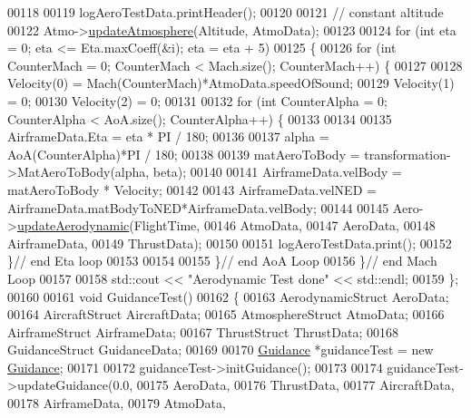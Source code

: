 \begin{DoxyCode}
00118 
00119     logAeroTestData.printHeader();
00120 
00121     \textcolor{comment}{// constant altitude}
00122     Atmo->\hyperlink{group___atmosphere_a2bd97471d32725d6196ee6816ea36c99}{updateAtmosphere}(Altitude, AtmoData);
00123 
00124     \textcolor{keywordflow}{for} (\textcolor{keywordtype}{int} eta = 0; eta <= Eta.maxCoeff(&i); eta = eta + 5)
00125     \{
00126         \textcolor{keywordflow}{for} (\textcolor{keywordtype}{int} CounterMach = 0; CounterMach < Mach.size(); CounterMach++) \{
00127 
00128             Velocity(0) = Mach(CounterMach)*AtmoData.speedOfSound;
00129             Velocity(1) = 0;
00130             Velocity(2) = 0;
00131 
00132             \textcolor{keywordflow}{for} (\textcolor{keywordtype}{int} CounterAlpha = 0; CounterAlpha < AoA.size(); CounterAlpha++) \{
00133 
00134 
00135                 AirframeData.Eta = eta * PI / 180;
00136 
00137                 alpha = AoA(CounterAlpha)*PI / 180;
00138 
00139                 matAeroToBody = transformation->MatAeroToBody(alpha, beta);
00140 
00141                 AirframeData.velBody = matAeroToBody * Velocity;
00142 
00143                 AirframeData.velNED = AirframeData.matBodyToNED*AirframeData.velBody;
00144 
00145                 Aero->\hyperlink{group___aerodynamic_adf6047b063022ff3b689e269d2b35863}{updateAerodynamic}(FlightTime,
00146                     AtmoData,
00147                     AeroData,
00148                     AirframeData,
00149                     ThrustData);
00150 
00151                 logAeroTestData.print();
00152             \}\textcolor{comment}{// end Eta loop}
00153 
00154 
00155         \}\textcolor{comment}{// end AoA Loop}
00156     \}\textcolor{comment}{// end Mach Loop}
00157     
00158     std::cout << \textcolor{stringliteral}{"Aerodynamic Test done"} << std::endl;
00159 \};
00160 
00161 \textcolor{keywordtype}{void} GuidanceTest()
00162 \{
00163     AerodynamicStruct  AeroData;
00164     AircraftStruct     AircraftData;
00165     AtmosphereStruct   AtmoData;
00166     AirframeStruct  AirframeData;
00167     ThrustStruct  ThrustData;
00168     GuidanceStruct GuidanceData;
00169 
00170     \hyperlink{class_guidance}{Guidance} *guidanceTest = \textcolor{keyword}{new} \hyperlink{class_guidance}{Guidance};
00171 
00172     guidanceTest->initGuidance();
00173 
00174     guidanceTest->updateGuidance(0.0,
00175                                 AeroData,
00176                                 ThrustData,
00177                                 AircraftData,
00178                                 AirframeData,
00179                                 AtmoData, 

\end{DoxyCode}

